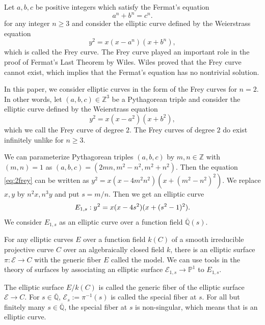 \documentclass[main]{subfiles}
\begin{document}
Let $a,b,c$ be positive integers which satisfy the Fermat's equation
\begin{equation*}
    a^{n} + b^{n} = c^{n}.
\end{equation*}
for any integer $n \geq 3$ and consider the elliptic curve defined by the Weierstrass equation
\begin{equation*}
    y^{2} = x(x - a^{n})(x + b^{n}),
\end{equation*}
which is called the Frey curve.
The Frey curve played an important role in the proof of Fermat's Last Theorem by Wiles.
Wiles proved that the Frey curve cannot exist, which implies that the Fermat's equation has no nontrivial solution.

In this paper, we consider elliptic curves in the form of the Frey curves for $n=2$.
In other words, let $(a,b,c) \in \mathbb{Z}^3$ be a Pythagorean triple and consider the elliptic curve defined by the Weierstrass equation
\begin{equation}
    \label{eq:2frey}
    y^{2} = x(x - a^{2})(x + b^{2}),
\end{equation}
which we call the Frey curve of degree $2$.
The Frey curves of degree $2$ do exist infinitely unlike for $n \geq 3$.

We can parameterize Pythagorean triples $(a,b,c)$ by $m,n \in \mathbb{Z}$ with $(m,n)=1$ as $(a,b,c) = (2mn, m^{2} - n^{2}, m^{2} + n^{2})$.
Then the equation \eqref{eq:2frey} can be written as $y^{2} = x(x - 4m^2n^2)(x + (m^{2} - n^2)^{2})$.
We replace $x,y$ by $n^2x, n^3y$ and put $s = m/n$.
Then we get an elliptic curve
\begin{equation}
    \label{eq:E_{1,s}}
    E_{1,s}: y^{2} = x(x - 4s^{2})(x + (s^{2} - 1)^{2}).
\end{equation}
We consider $E_{1,s}$ as an elliptic curve over a function field $\overline{\mathbb{Q}}(s)$.

For any elliptic curves $E$ over a function field $k(C)$ of a smooth irreducible projective curve $C$ over an algebraically closed field $k$, there is an elliptic surface $\pi: \mathcal{E} \to C$ with the generic fiber $E$ called the \Neron{} model.
We can use tools in the theory of surfaces by associating an elliptic surface $\mathcal{E}_{1,s} \to \mathbb{P}^1$ to $E_{1,s}$.

The elliptic surface $E/k(C)$ is called the generic fiber of the elliptic surface $\mathcal{E} \to C$.
For $s \in \overline{\mathbb{Q}}$, $\mathcal{E}_s:=\pi^{-1}(s)$ is called the special fiber at $s$.
For all but finitely many $s \in \overline{\mathbb{Q}}$, the special fiber at $s$ is non-singular, which means that is an elliptic curve.
\end{document}
